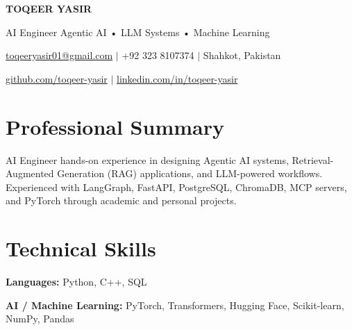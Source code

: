 \documentclass[11pt,a4paper]{article}
\newcommand{\resumeSection}[1]{
    \section*{#1}
}
\begin{document}

\begin{center}

{\LARGE\bfseries\color{heading} TOQEER YASIR}

\vspace{4pt}

{\large AI Engineer \enspace\textbar\enspace Agentic AI • LLM Systems • Machine Learning}

\vspace{6pt}

\href{mailto:toqeeryasir01@gmail.com}{toqeeryasir01@gmail.com}
\hspace{0.8em}$\vert$\hspace{0.8em}
+92 323 8107374
\hspace{0.8em}$\vert$\hspace{0.8em}
Shahkot, Pakistan

\vspace{3pt}

\href{https://github.com/toqeer-yasir}{github.com/toqeer-yasir}
\hspace{0.8em}$\vert$\hspace{0.8em}
\href{https://linkedin.com/in/toqeer-yasir}{linkedin.com/in/toqeer-yasir}

\end{center}


\resumeSection{Professional Summary}
AI Engineer hands-on experience in designing Agentic AI systems, Retrieval-Augmented Generation (RAG) applications, and LLM-powered workflows. Experienced with LangGraph, FastAPI, PostgreSQL, ChromaDB, MCP servers, and PyTorch through academic and personal projects.


\resumeSection{Technical Skills}

\textbf{Languages:}
Python, C++, SQL

\vspace{2pt}

\textbf{AI / Machine Learning:}
PyTorch, Transformers, Hugging Face, Scikit-learn, NumPy, Pandas
\end{document}
